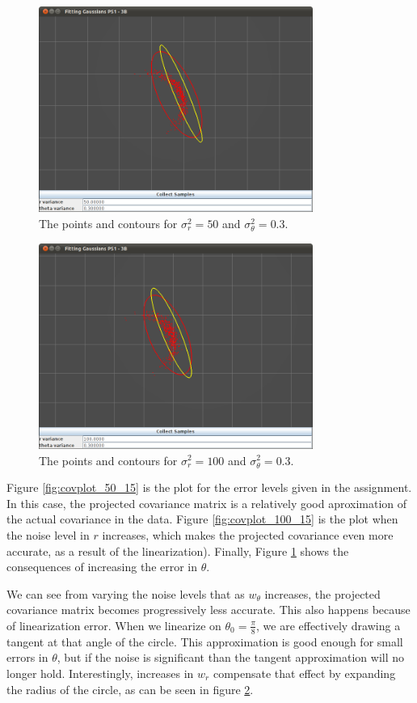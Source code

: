 \documentclass[12pt]{article}
\begin{document}
\begin{figure}
\centering
\includegraphics[width=0.8\textwidth]{figures/GaussianFit_50_0_3.png}
\caption{The points and contours for $\sigma^2_r=50$ and $\sigma^2_\theta=0.3$.}
\label{fig:covplot_50_30}
\end{figure}

\begin{figure}
\centering
\includegraphics[width=0.8\textwidth]{figures/GaussianFit_100_0_3.png}
\caption{The points and contours for $\sigma^2_r=100$ and $\sigma^2_\theta=0.3$.}
\label{fig:covplot_100_30}
\end{figure}

Figure \ref{fig:covplot_50_15} is the plot for the error levels given in the assignment. In this case, the projected covariance matrix is a relatively good aproximation of the actual covariance in the data. Figure \ref{fig:covplot_100_15} is the plot when the noise level in $r$ increases, which makes the projected covariance even more accurate, as a result of the linearization). Finally, Figure \ref{fig:covplot_50_30} shows the consequences of increasing the error in $\theta$.

We can see from varying the noise levels that as $w_\theta$ increases, the projected covariance matrix becomes progressively less accurate. This also happens because of linearization error. When we linearize on $\theta_0=\frac{\pi}{8}$, we are effectively drawing a tangent at that angle of the circle. This approximation is good enough for small errors in $\theta$, but if the noise is significant than the tangent approximation will no longer hold. Interestingly, increases in $w_r$ compensate that effect by expanding the radius of the circle, as can be seen in figure \ref{fig:covplot_100_30}.

\end{document}
